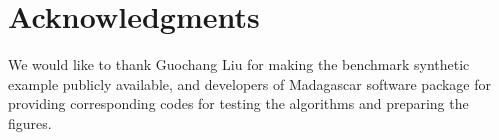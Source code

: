 \section{Acknowledgments}
We would like to thank Guochang Liu for making the benchmark synthetic example publicly available, and developers of Madagascar software package for providing corresponding codes for testing the algorithms and preparing the figures.











